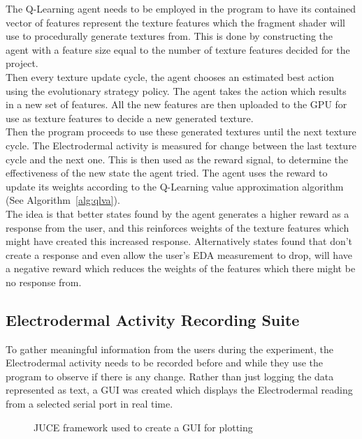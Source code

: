 \documentclass{report}
\begin{document}
The Q-Learning agent needs to be employed in the program to have its contained vector of features represent the texture features which the fragment shader will use to 
procedurally generate textures from. This is done by constructing the agent with a feature size equal to the number of texture features decided for the project.\\
Then every texture update cycle, the agent chooses an estimated best action using the evolutionary strategy policy. The agent takes the action which results in a new set of features.
All the new features are then uploaded to the GPU for use as texture features to decide a new generated texture.\\
Then the program proceeds to use these generated textures until the next texture cycle. The Electrodermal activity is measured for change between the last texture cycle and the next one.
This is then used as the reward signal, to determine the effectiveness of the new state the agent tried. The agent uses the reward to update its weights according to the Q-Learning
value approximation algorithm (See Algorithm~\ref{alg:qlva}).\\
The idea is that better states found by the agent generates a higher reward as a response from the user, and this reinforces weights of the texture features which
might have created this increased response. Alternatively states found that don't create a response and even allow the user's EDA measurement to drop, will have a 
negative reward which reduces the weights of the features which there might be no response from.


\subsection{Electrodermal Activity Recording Suite}

To gather meaningful information from the users during the experiment, the Electrodermal activity needs to be recorded before and while they use the program to
observe if there is any change. Rather than just logging the data represented as text, a GUI was created which displays the Electrodermal reading from a selected
serial port in real time.

\begin{figure}
\centerline{}
\caption[Electrodermal Activity Suite]{}
\centerline{JUCE framework used to create a GUI for plotting }
\end{figure}
\end{document}
